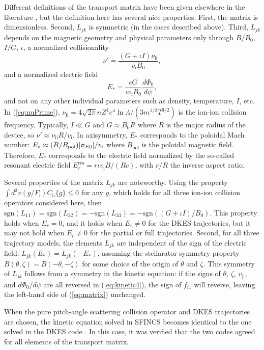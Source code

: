 \documentclass[12pt]{revtex4}
\newcommand{\vect}[1]{\mbox{\boldmath $#1$}}
\newcommand{\vEo}{\vect{v}_{E0}}
\newcommand{\vi}{v_{\mathrm{i}}}
\newcommand{\nuii}{\nu_{\mathrm{ii}}}
\newcommand{\sgn}{\mathrm{sgn}}
\newcommand{\Erres}{E_r^{\mathrm{res}}}
\newcommand{\Bpol}{B_{\mathrm{pol}}}
\begin{document}
Different definitions of the transport matrix have been given elsewhere in the literature \cite{Beidler},
but the definition here has several nice properties. First, the matrix is dimensionless. Second, $L_{jk}$ is symmetric (in the cases described above).
Third, $L_{jk}$ depends on the magnetic geometry and physical parameters only through
$B/B_0$, $I/G$, $\iota$, a normalized collisionality
\begin{equation}
\nu' = \frac{(G+\iota I)\nuii}{\vi B_0},
\label{eq:nuPrime}
\end{equation}
and a normalized electric field
\begin{equation}
E_* = \frac{c G}{\iota \vi B_0}\frac{d\Phi_0}{d\psi},
\end{equation}
and not on any other individual parameters such as density, temperature, $I$, etc.
In (\ref{eq:nuPrime}), $\nuii = 4\sqrt{2\pi} n Z^4 e^4 \ln\Lambda/(3 m^{1/2} T^{3/2})$
is the ion-ion collision frequency.
Typically, $I \ll G$ and $G \approx B_0 R$ where $R$ is the major radius of the device,
so $\nu' \approx \nuii R / \vi$.
In axisymmetry, $E_*$ corresponds to the poloidal Mach number: $E_* \approx (B / \Bpol) | \vEo | / \vi$
where $\Bpol$ is the poloidal magnetic field.
Therefore, $E_*$ corresponds to the electric field normalized by the so-called resonant electric field \cite{Beidler}
$\Erres = r\iota \vi B/(R c)$, with $r/R$ the inverse aspect ratio.

Several properties of the matrix $L_{jk}$ are noteworthy. Using the property $\int d^3v (g/F_{\mathrm{i}}) C_{\mathrm{ii}}\{g\} \le 0$
for any $g$, which holds for all three ion-ion collision operators considered here,
then $\sgn(L_{11}) = \sgn(L_{22}) = -\sgn(L_{33}) = -\sgn((G+\iota I)/B_0)$.
This property holds when $E_r=0$, and it holds when $E_r \ne 0$ for the DKES trajectories, but it
may not hold when $E_r \ne 0$ for the partial or full trajectories.
Second, for all three trajectory models, the elements $L_{jk}$
are independent of the sign of the electric field: $L_{jk}(E_*) = L_{jk}(-E_*)$,
assuming the stellarator symmetry property $B(\theta,\zeta) = B(-\theta,-\zeta)$
for some choice of the origin of $\theta$ and $\zeta$.
This symmetry of $L_{jk}$ follows from a symmetry in the kinetic equation:
if the signs of 
$\theta$, $\zeta$, $v_{||}$, and $d\Phi_0/d\psi$ are all reversed
in (\ref{eq:kinetic4}), the sign of $f_{i1}$ will reverse,
leaving the left-hand side of (\ref{eq:matrix}) unchanged.

When the pure pitch-angle scattering collision operator 
and DKES trajectories are chosen, the kinetic equation
solved in SFINCS becomes identical to the one solved in the DKES code \cite{DKES1, DKES2}.
In this case, it was verified that the two codes agreed for all elements of the transport
matrix.
\end{document}
